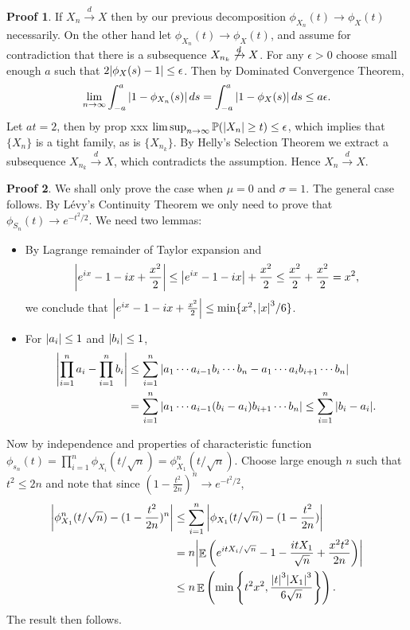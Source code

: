 \documentclass[hidelinks,11pt]{article}
\theoremstyle{definition}
\theoremstyle{dotless}
\newtheorem{prop}{Proof}[section]
\theoremstyle{remark}
\DeclareMathOperator{\E}{\mathbb{E}}
\DeclareMathOperator{\1}{\mathbf{1}}
\begin{document}
\begin{prop}
If $X_n\xrightarrow{d}X$ then by our previous decomposition $\phi_{X_n}(t)\to\phi_X(t)$ necessarily.\medbreak
On the other hand let $\phi_{X_n}(t)\to\phi_X(t)$, and assume for contradiction that there is a subsequence $X_{n_k}\not\xrightarrow{d}X$. For any $\epsilon>0$ choose small enough $a$ such that $2\abs{\phi_X(s)-1}\leq\epsilon$. Then by Dominated Convergence Theorem,
\[\lim_{n\to\infty}\int_{-a}^a\abs{1-\phi_{X_n}(s)}\,ds=\int_{-a}^a\abs{1-\phi_X(s)}\,ds\leq a\epsilon.\]
Let $at=2$, then by prop xxx $\limsup_{n\to\infty}\mathbb{P}(\abs{X_n}\geq t)\leq\epsilon$, which implies that $\{X_n\}$ is a tight family, as is $\{X_{n_k}\}$. By Helly's Selection Theorem we extract a subsequence $X_{n_k}\xrightarrow{d}X$, which contradicts the assumption. Hence $X_n\xrightarrow{d}X$.
\end{prop}

\begin{prop}
We shall only prove the case when $\mu=0$ and $\sigma=1$. The general case follows. By Lévy's Continuity Theorem we only need to prove that $\phi_{S_n}(t)\to e^{-t^2/2}$. We need two lemmas:\begin{itemize}
    \item By Lagrange remainder of Taylor expansion and
    \[\abs{e^{ix}-1-ix+\frac{x^2}{2}}\leq\abs{e^{ix}-1-ix}+\frac{x^2}{2}\leq\frac{x^2}{2}+\frac{x^2}{2}=x^2,\]
    we conclude that $\abs{e^{ix}-1-ix+\frac{x^2}{2}}\leq\min\{x^2,\abs{x}^3/6\}$.
    \item For $\abs{a_i}\leq1$ and $\abs{b_i}\leq1$,
    \begin{align*}
    \abs{\prod_{i=1}^na_i-\prod_{i=1}^nb_i}&\leq\sum_{i=1}^n\abs{a_1\cdots a_{i-1}b_i\cdots b_n-a_1\cdots a_ib_{i+1}\cdots b_n}\\
    &=\sum_{i=1}^n\abs{a_1\cdots a_{i-1}(b_i-a_i)b_{i+1}\cdots b_n}\leq\sum_{i=1}^n\abs{b_i-a_i}.
    \end{align*}
\end{itemize}
Now by independence and properties of characteristic function $\phi_{s_n}(t)=\prod_{i=1}^n\phi_{X_i}(t/\sqrt{n})=\phi_{X_1}^n(t/\sqrt{n})$. Choose large enough $n$ such that $t^2\leq2n$ and note that since $(1-\frac{t^2}{2n})^n\to e^{-t^2/2}$,
\begin{align*}
    \abs{\phi_{X_1}^n(t/\sqrt{n})-(1-\frac{t^2}{2n})^n}&\leq\sum_{i=1}^n\abs{\phi_{X_1}(t/\sqrt{n})-(1-\frac{t^2}{2n})}\\
    &=n\abs{\E\left(e^{itX_i/\sqrt{n}}-1-\frac{itX_1}{\sqrt{n}}+\frac{x^2t^2}{2n}\right)}\\
    &\leq n\E\left(\min\left\{t^2x^2,\frac{\abs{t}^3\abs{X_1}^3}{6\sqrt{n}}\right\}\right).
\end{align*}
The result then follows.
\end{prop}
\end{document}
